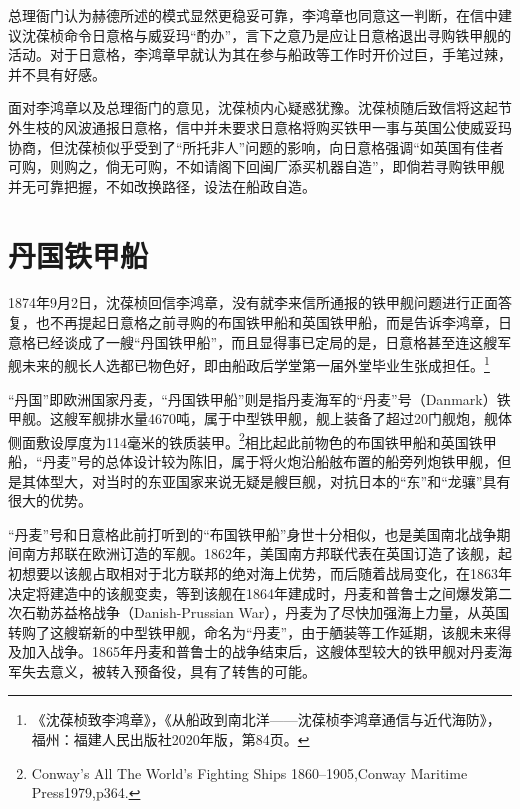 \documentclass[12pt,UTF8]{ctexbook}
\begin{document}
总理衙门认为赫德所述的模式显然更稳妥可靠，李鸿章也同意这一判断，在信中建议沈葆桢命令日意格与威妥玛“酌办”，言下之意乃是应让日意格退出寻购铁甲舰的活动。对于日意格，李鸿章早就认为其在参与船政等工作时开价过巨，手笔过辣，并不具有好感。

面对李鸿章以及总理衙门的意见，沈葆桢内心疑惑犹豫。沈葆桢随后致信将这起节外生枝的风波通报日意格，信中并未要求日意格将购买铁甲一事与英国公使威妥玛协商，但沈葆桢似乎受到了“所托非人”问题的影响，向日意格强调“如英国有佳者可购，则购之，倘无可购，不如请阁下回闽厂添买机器自造”，即倘若寻购铁甲舰并无可靠把握，不如改换路径，设法在船政自造。

\section{丹国铁甲船}

1874年9月2日，沈葆桢回信李鸿章，没有就李来信所通报的铁甲舰问题进行正面答复，也不再提起日意格之前寻购的布国铁甲船和英国铁甲船，而是告诉李鸿章，日意格已经谈成了一艘“丹国铁甲船”，而且显得事已定局的是，日意格甚至连这艘军舰未来的舰长人选都已物色好，即由船政后学堂第一届外堂毕业生张成担任。\footnote{《沈葆桢致李鸿章》，《从船政到南北洋——沈葆桢李鸿章通信与近代海防》，福州：福建人民出版社2020年版，第84页。}

“丹国”即欧洲国家丹麦，“丹国铁甲船”则是指丹麦海军的“丹麦”号（Danmark）铁甲舰。这艘军舰排水量4670吨，属于中型铁甲舰，舰上装备了超过20门舰炮，舰体侧面敷设厚度为114毫米的铁质装甲。\footnote{Conway's All The World's Fighting Ships 1860--1905,Conway Maritime Press1979,p364.}相比起此前物色的布国铁甲船和英国铁甲船，“丹麦”号的总体设计较为陈旧，属于将火炮沿船舷布置的船旁列炮铁甲舰，但是其体型大，对当时的东亚国家来说无疑是艘巨舰，对抗日本的“东”和“龙骧”具有很大的优势。

“丹麦”号和日意格此前打听到的“布国铁甲船”身世十分相似，也是美国南北战争期间南方邦联在欧洲订造的军舰。1862年，美国南方邦联代表在英国订造了该舰，起初想要以该舰占取相对于北方联邦的绝对海上优势，而后随着战局变化，在1863年决定将建造中的该舰变卖，等到该舰在1864年建成时，丹麦和普鲁士之间爆发第二次石勒苏益格战争（Danish-Prussian War），丹麦为了尽快加强海上力量，从英国转购了这艘崭新的中型铁甲舰，命名为“丹麦”，由于舾装等工作延期，该舰未来得及加入战争。1865年丹麦和普鲁士的战争结束后，这艘体型较大的铁甲舰对丹麦海军失去意义，被转入预备役，具有了转售的可能。
\end{document}
